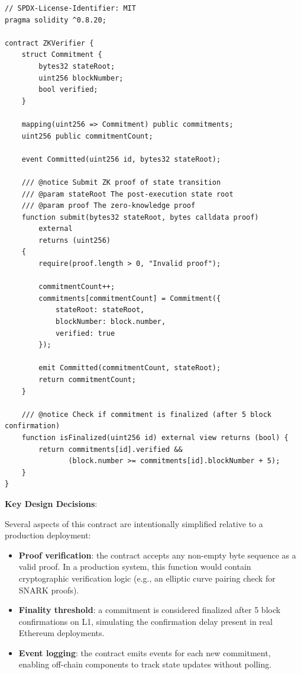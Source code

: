 \documentclass[
]{elteikthesis}[2024/04/26]
\begin{document}
\begin{listing}[H]
    \begin{verbatim}
// SPDX-License-Identifier: MIT
pragma solidity ^0.8.20;

contract ZKVerifier {
    struct Commitment {
        bytes32 stateRoot;
        uint256 blockNumber;
        bool verified;
    }

    mapping(uint256 => Commitment) public commitments;
    uint256 public commitmentCount;
    
    event Committed(uint256 id, bytes32 stateRoot);

    /// @notice Submit ZK proof of state transition
    /// @param stateRoot The post-execution state root
    /// @param proof The zero-knowledge proof
    function submit(bytes32 stateRoot, bytes calldata proof) 
        external 
        returns (uint256) 
    {
        require(proof.length > 0, "Invalid proof");
        
        commitmentCount++;
        commitments[commitmentCount] = Commitment({
            stateRoot: stateRoot,
            blockNumber: block.number,
            verified: true
        });
        
        emit Committed(commitmentCount, stateRoot);
        return commitmentCount;
    }

    /// @notice Check if commitment is finalized (after 5 block confirmation)
    function isFinalized(uint256 id) external view returns (bool) {
        return commitments[id].verified && 
               (block.number >= commitments[id].blockNumber + 5);
    }
}
    \end{verbatim}
    \caption{ZKVerifier.sol - Solidity implementation}
    \label{lst:zkverifier}
\end{listing}

\textbf{Key Design Decisions}:

Several aspects of this contract are intentionally simplified relative to a production deployment:
\begin{itemize}
    \item \textbf{Proof verification}: the contract accepts any non-empty byte sequence as a valid proof. In a production system, this function would contain cryptographic verification logic (e.g., an elliptic curve pairing check for SNARK proofs).
    \item \textbf{Finality threshold}: a commitment is considered finalized after 5 block confirmations on L1, simulating the confirmation delay present in real Ethereum deployments.
    \item \textbf{Event logging}: the contract emits events for each new commitment, enabling off-chain components to track state updates without polling.
\end{itemize}
\end{document}
